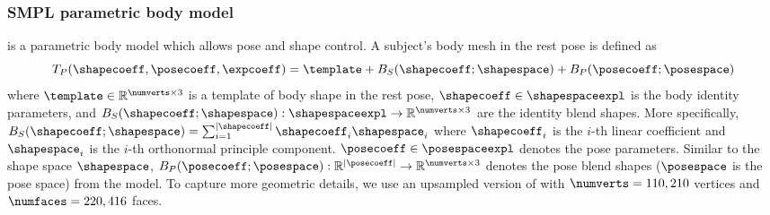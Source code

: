 \subsubsection{SMPL parametric body model}

\smpl is a parametric body model which allows pose and shape control. A subject's body mesh in the rest pose is defined as
\begin{equation}
    T_P(\shapecoeff,\posecoeff, \expcoeff) = \template + B_{S}(\shapecoeff;\shapespace) +  B_{P}(\posecoeff;\posespace)
\end{equation}
where $\template \in \mathbb{R}^{\numverts \times 3}$ is a template of body shape in the rest pose, $\shapecoeff \in \shapespaceexpl$ is the body identity parameters, and $B_{S}(\shapecoeff;\shapespace): \shapespaceexpl \rightarrow \mathbb{R}^{\numverts \times 3}$ are the identity blend shapes. More specifically, $B_S(\shapecoeff;\shapespace)=\sum_{i=1}^{|\shapecoeff|}\shapecoeff_i\shapespace_i$ where $\shapecoeff_i$ is the $i$-th linear coefficient and $\shapespace_i$ is the $i$-th orthonormal principle component. $\posecoeff\in\posespaceexpl$ denotes the pose parameters. Similar to the shape space $\shapespace$, $B_{P}(\posecoeff;\posespace): \mathbb{R}^{|\posecoeff|} \rightarrow \mathbb{R}^{\numverts \times 3}$ denotes the pose blend shapes ($\posespace$ is the pose space) from the \smpl model.
To capture more geometric details, we use an upsampled version of \smpl with $\numverts=110,210$ vertices and $\numfaces=220,416$ faces.


